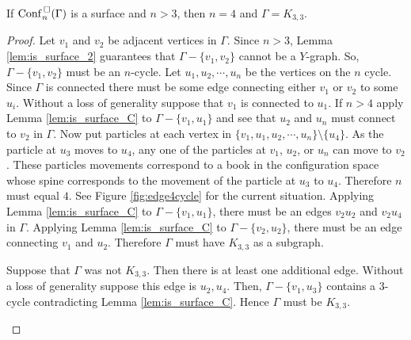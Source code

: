 \begin{thm}
    If \(\mathrm{Conf}^{\,\square}_n(\Gamma)\) is a surface and \(n > 3\), then \(n = 4\) and \(\Gamma = K_{3,3}\).
\end{thm}
\begin{proof}
    Let \(v_1\) and \(v_2\) be adjacent vertices in \(\Gamma\).
    Since \(n > 3\), Lemma \ref{lem:is_surface_2} guarantees that \(\Gamma - \{v_1, v_2\}\) cannot be a \(Y\)-graph.
    So, \(\Gamma - \{v_1, v_2\}\) must be an \(n\)-cycle.
    Let \(u_1, u_2, \cdots, u_n\) be the vertices on the \(n\) cycle.
    Since \(\Gamma\) is connected there must be some edge connecting either \(v_1\) or \(v_2\) to some \(u_i\).
    Without a loss of generality suppose that \(v_1\) is connected to \(u_1\).
    If \(n > 4\) apply Lemma \ref{lem:is_surface_C} to \(\Gamma - \{v_1, u_1\}\) and see that
    \(u_2\) and \(u_n\) must connect to \(v_2\) in \(\Gamma\).
    Now put particles at each vertex in \(\{v_1, u_1, u_2, \cdots, u_n\}\setminus\{u_4\}\).
    As the particle at \(u_3\) moves to \(u_4\), any one of the particles at \(v_1\), \(u_2\), or \(u_n\) 
    can move to \(v_2\). These particles movements correspond to a book in the configuration space
    whose spine corresponds to the movement of the particle at \(u_3\) to \(u_4\).
    Therefore \(n\) must equal \(4\).
    See Figure \ref{fig:edge4cycle} for the current situation.
    Applying Lemma \ref{lem:is_surface_C} to \(\Gamma - \{v_1, u_1\}\), there must be an edges
    \(v_2 u_2\) and \(v_2 u_4\) in \(\Gamma\).
    Applying Lemma \ref{lem:is_surface_C} to \(\Gamma - \{v_2, u_2\}\), there must be an edge connecting \(v_1\)
    and \(u_2\).
    Therefore \(\Gamma\) must have \(K_{3,3}\) as a subgraph.

    Suppose that \(\Gamma\) was not \(K_{3,3}\).
    Then there is at least one additional edge.
    Without a loss of generality suppose this edge is \(u_2, u_4\).
    Then, \(\Gamma - \{v_1, u_3\}\) contains a \(3\)-cycle contradicting Lemma \ref{lem:is_surface_C}.
    Hence \(\Gamma\) must be \(K_{3,3}\).
    \begin{figure}[h!]
        \centering
\end{figure}
\end{proof}
